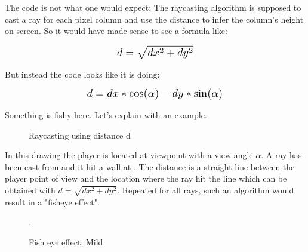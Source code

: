 The code is not what one would expect: The raycasting algorithm is supposed to cast a ray for each pixel column and use the distance  to infer the column's height on screen. So it would have made sense to see a formula like:
\begin{figure}[H]
  \centering
  \begin{equation*}
    \scalebox{1.3}{
$ d = \sqrt{dx^2 + dy^2}$ 
 }
  \end{equation*}
\end{figure}
But instead the code looks like it is doing: 
\begin{figure}[H]
  \centering
  \begin{equation*}
    \scalebox{1.3}{
$d = dx * \cos(\alpha) - dy * \sin(\alpha) $
 }
  \end{equation*}
\end{figure}
Something is fishy here. Let's explain with an example.\\
\par
\begin{figure}[H]
\centering
 
 \caption{Raycasting using distance d} \label{fig:Raycasting2}
\end{figure}

In this drawing the player is located at viewpoint with a view angle \begin{math}\alpha\end{math}. A ray has been cast from  and it hit a wall at . The distance  is a straight line between the player point of view and the location where the ray hit the line which can be obtained with $d = \sqrt{dx^2 + dy^2}$. Repeated for all rays, such an algorithm would result in a "fisheye effect".

\begin{figure}[H]
\centering
 \caption{Fish eye effect: Mild}. \label{fig:mips}
 \end{figure}









